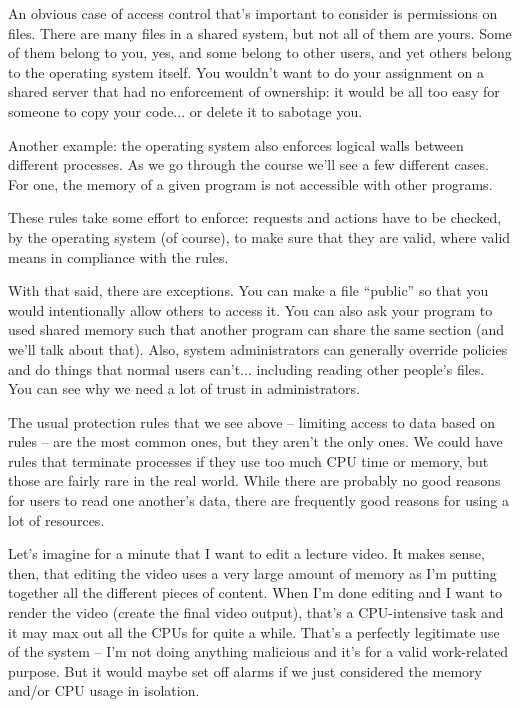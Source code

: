An obvious case of access control that's important to consider is permissions on files. There are many files in a shared system, but not all of them are yours. Some of them belong to you, yes, and some belong to other users, and yet others belong to the operating system itself. You wouldn't want to do your assignment on a shared server that had no enforcement of ownership: it would be all too easy for someone to copy your code... or delete it to sabotage you. 

Another example: the operating system also enforces logical walls between different processes. As we go through the course we'll see a few different cases. For one, the memory of a given program is not accessible with other programs.

These rules take some effort to enforce: requests and actions have to be checked, by the operating system (of course), to make sure that they are valid, where valid means in compliance with the rules.

With that said, there are exceptions. You can make a file ``public'' so that you would intentionally allow others to access it. You can also ask your program to used shared memory such that another program can share the same section (and we'll talk about that). Also, system administrators can generally override policies and do things that normal users can't... including reading other people's files. You can see why we need a lot of trust in administrators.

The usual protection rules that we see above -- limiting access to data based on rules -- are the most common ones, but they aren't the only ones. We could have rules that terminate processes if they use too much CPU time or memory, but those are fairly rare in the real world. While there are probably no good reasons for users to read one another's data, there are frequently good reasons for using a lot of resources. 

Let's imagine for a minute that I want to edit a lecture video. It makes sense, then, that editing the video uses a very large amount of memory as I'm putting together all the different pieces of content. When I'm done editing and I want to render the video (create the final video output), that's a CPU-intensive task and it may max out all the CPUs for quite a while. That's a perfectly legitimate use of the system -- I'm not doing anything malicious and it's for a valid work-related purpose. But it would maybe set off alarms if we just considered the memory and/or CPU usage in isolation.

